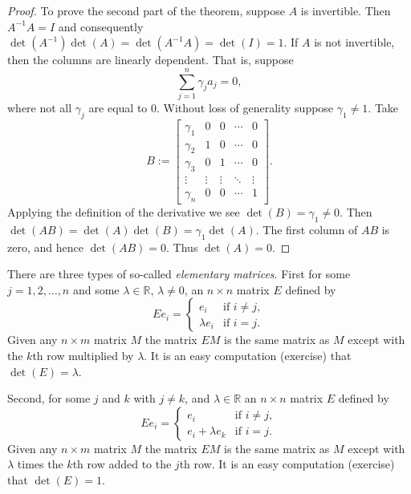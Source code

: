 \documentclass[12pt]{book}
\newcommand{\R}{{\mathbb{R}}}
\theoremstyle{plain}
\theoremstyle{remark}
\theoremstyle{definition}
\theoremstyle{exercise}
\theoremstyle{example}
\begin{document}
\begin{proof}
To prove the second part of the theorem, suppose $A$ is invertible.
Then $A^{-1}A = I$ and consequently $\det(A^{-1})\det(A) = \det(A^{-1}A) = \det(I) = 1$.
If $A$ is not invertible, then the columns are linearly dependent.
That is,
suppose 
\begin{equation*}
\sum_{j=1}^n \gamma_j a_j = 0 ,
\end{equation*}
where not all $\gamma_j$ are equal to 0.
Without loss of generality suppose $\gamma_1\neq 1$.
Take
\begin{equation*}
B := 
\begin{bmatrix}
\gamma_1 & 0 & 0 & \cdots & 0 \\
\gamma_2 & 1 & 0 & \cdots & 0 \\
\gamma_3 & 0 & 1 & \cdots & 0 \\
\vdots & \vdots & \vdots & \ddots & \vdots \\
\gamma_n & 0 & 0 & \cdots & 1
\end{bmatrix} .
\end{equation*}
Applying the definition of the derivative
we see $\det(B) = \gamma_1 \not= 0$.
Then
$\det(AB) = \det(A)\det(B) = \gamma_1\det(A)$.
The first column of $AB$ is zero, and hence $\det(AB) = 0$.  Thus
$\det(A) = 0$.
\end{proof}

There are three types of so-called
\emph{elementary matrices}.  First for some $j =
1,2,\ldots,n$ and
some $\lambda \in \R$, $\lambda \neq 0$, an
$n \times n$ matrix $E$ defined by
\begin{equation*}
Ee_i = 
\begin{cases}
e_i & \text{if $i \neq j$} , \\
\lambda e_i & \text{if $i = j$} .
\end{cases}
\end{equation*}
Given any $n \times m$ matrix $M$ the matrix $EM$ is the same matrix as $M$
except with the $k$th row multiplied by $\lambda$.
It is an easy computation (exercise) that $\det(E) = \lambda$.

Second, for some $j$ and $k$ with $j\neq k$, and $\lambda \in \R$ an
$n \times n$ matrix $E$ defined by
\begin{equation*}
Ee_i = 
\begin{cases}
e_i & \text{if $i \neq j$} , \\
e_i + \lambda e_k & \text{if $i = j$} .
\end{cases}
\end{equation*}
Given any $n \times m$ matrix $M$ the matrix $EM$ is the same matrix as $M$
except with $\lambda$ times the $k$th row added to the $j$th row.
It is an easy computation (exercise) that $\det(E) = 1$.
\end{document}
